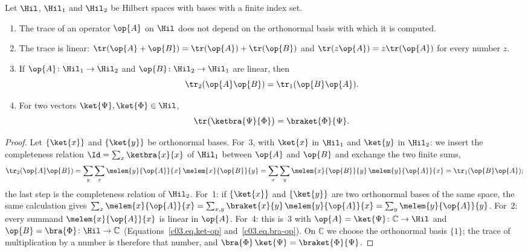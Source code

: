 \begin{proposition}\label{c03.prop.spur}
  Let $\Hil$, $\Hil_1$ and $\Hil_2$ be Hilbert spaces with bases with a finite index set.
  \begin{enumerate}
    \item The trace of an operator $\op{A}$ on $\Hil$ does not depend on the orthonormal basis
      with which it is computed.
    \item The trace is linear: $\tr(\op{A} + \op{B}) = \tr(\op{A}) + \tr(\op{B})$ and
      $\tr(z\op{A}) = z \tr(\op{A})$ for every number $z$.
    \item If $\op{A}\colon \Hil_1 \to \Hil_2$ and $\op{B}\colon \Hil_2 \to \Hil_1$ are linear, then
      \begin{equation}\label{c03.eq.zyklisch}
        \tr_2(\op{A}\op{B}) = \tr_1(\op{B}\op{A}) .
      \end{equation}
    \item For two vectors $\ket{\Psi}, \ket{\Phi} \in \Hil$,
      \begin{equation}\label{c03.eq.spur-ketbra}
        \tr\bigl(\ketbra{\Psi}{\Phi}\bigr) = \braket{\Phi}{\Psi} .
      \end{equation}
  \end{enumerate}
\end{proposition}
\begin{proof}
  Let $\{\ket{x}\}$ and $\{\ket{y}\}$ be orthonormal bases. For~3, with $\ket{x}$ in $\Hil_1$ and
  $\ket{y}$ in $\Hil_2$: we insert the completeness relation $\Id = \sum_x \ketbra{x}{x}$ of
  $\Hil_1$ between $\op{A}$ and $\op{B}$ and exchange the two finite sums,
  \begin{equation*}
    \tr_2(\op{A}\op{B})
    = \sum_{y} \sum_{x} \melem{y}{\op{A}}{x}\, \melem{x}{\op{B}}{y}
    = \sum_{x} \sum_{y} \melem{x}{\op{B}}{y}\, \melem{y}{\op{A}}{x}
    = \tr_1(\op{B}\op{A}) ;
  \end{equation*}
  the last step is the completeness relation of $\Hil_2$. For~1: if $\{\ket{x}\}$ and
  $\{\ket{y}\}$ are two orthonormal bases of the same space, the same calculation gives
  $\sum_x \melem{x}{\op{A}}{x} = \sum_{x,y} \braket{x}{y}\, \melem{y}{\op{A}}{x} = \sum_y \melem{y}{\op{A}}{y}$.
  For~2: every summand $\melem{x}{\op{A}}{x}$ is linear in $\op{A}$. For~4: this is~3 with
  $\op{A} = \ket{\Psi}\colon \mathbb{C} \to \Hil$ and $\op{B} = \bra{\Phi}\colon \Hil \to \mathbb{C}$
  (Equations~\eqref{c03.eq.ket-op} and~\eqref{c03.eq.bra-op}). On $\mathbb{C}$ we choose the
  orthonormal basis $\{1\}$; the trace of multiplication by a number is therefore that number, and
  $\bra{\Phi}\,\ket{\Psi} = \braket{\Phi}{\Psi}$.
\end{proof}

